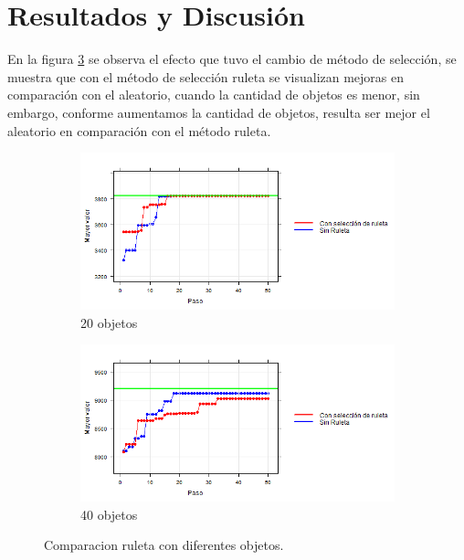 \documentclass{article}
\begin{document}
\section{Resultados y Discusi\'{o}n}\label{res}

 En la figura \ref{f1} se observa el efecto que tuvo el cambio de m\'etodo de selecci\'on, se muestra que con el m\'etodo de selecci\'on ruleta se visualizan mejoras en comparaci\'on con el aleatorio, cuando la cantidad de objetos es menor, sin embargo, conforme aumentamos la cantidad de objetos, resulta ser mejor el aleatorio en comparaci\'on con el m\'etodo ruleta.

\begin{figure}[H]
       \centering
       \begin{subfigure}[b]{0.85\linewidth}
           \includegraphics[width=\linewidth]{P10r20.png}
           \caption{20 objetos}
           \label{fig:westminster_lateral}
        \end{subfigure}
        \begin{subfigure}[b]{0.85\linewidth}
            \includegraphics[width=\linewidth]{P10r40.png}
            \caption{40 objetos}
            \label{fig:westminster_aerea}
        \end{subfigure}
        \caption{Comparacion ruleta con diferentes objetos.}
        \label{f1}
\end{figure}
\end{document}

